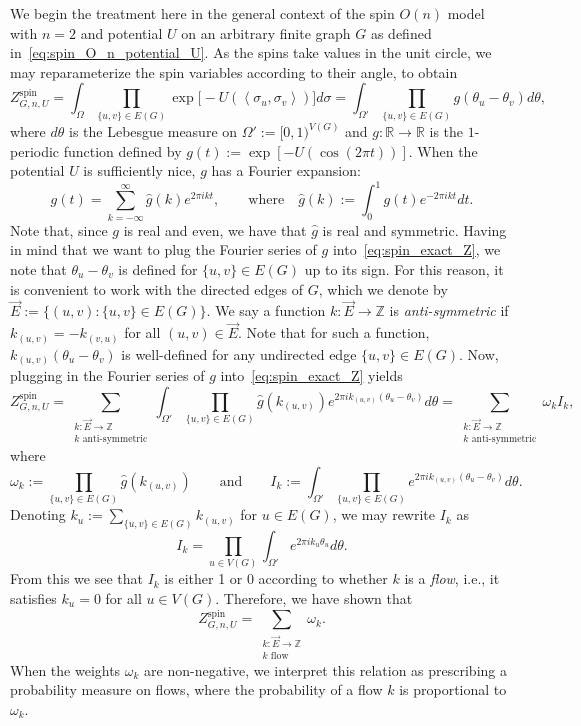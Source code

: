 \documentclass[12pt,reqno]{article}
\def\R{\mathbb{R}}
\def\Z{\mathbb{Z}}
\begin{document}
We begin the treatment here in the general context of the spin $O(n)$ model with $n=2$ and potential $U$ on an arbitrary finite graph $G$ as defined in~\eqref{eq:spin_O_n_potential_U}.
As the spins take values in the unit circle, we may reparameterize the spin variables according to their angle, to obtain
\begin{equation}\label{eq:spin_exact_Z}
Z^{\text{spin}}_{G,n,U} = \int_\Omega \prod_{\{u,v\}\in
    E(G)} \exp \Big[-U(\left\langle\sigma_u,\sigma_v\right\rangle)\Big]
d\sigma = \int_{\Omega'} \prod_{\{u,v\}\in
    E(G)} g(\theta_u - \theta_v)
d\theta ,
\end{equation}
where $d\theta$ is the Lebesgue measure on $\Omega' := [0,1)^{V(G)}$ and $g \colon \R \to \R$ is the $1$-periodic function defined by $g(t) := \exp[-U(\cos(2\pi t))]$.
When the potential $U$ is sufficiently nice, $g$ has a Fourier expansion:
\[ g(t) = \sum_{k=-\infty}^\infty \hat{g}(k) e^{2\pi ikt}, \qquad\text{where}\quad \hat{g}(k) := \int_0^1 g(t) e^{-2\pi ikt} dt .\]
Note that, since $g$ is real and even, we have that $\hat{g}$ is real and symmetric.
Having in mind that we want to plug the Fourier series of $g$ into~\eqref{eq:spin_exact_Z}, we note that $\theta_u - \theta_v$ is defined for $\{u,v\} \in E(G)$ up to its sign. For this reason, it is convenient to work with the directed edges of $G$, which we denote by $\vec{E} := \{ (u,v) : \{u,v\} \in E(G) \}$. We say a function $k \colon \vec{E} \to \Z$ is \emph{anti-symmetric} if $k_{(u,v)}=-k_{(v,u)}$ for all $(u,v) \in \vec{E}$. Note that for such a function, $k_{(u,v)}(\theta_u - \theta_v)$ is well-defined for any undirected edge $\{u,v\} \in E(G)$.
Now, plugging in the Fourier series of $g$ into~\eqref{eq:spin_exact_Z} yields
\[ Z^{\text{spin}}_{G,n,U} = \sum_{\substack{k \colon \vec{E} \to \Z\\k\text{ anti-symmetric}}} \int_{\Omega'} \prod_{\{u,v\}\in E(G)} \hat{g}(k_{(u,v)}) e^{2\pi ik_{(u,v)}(\theta_u - \theta_v)}
d\theta = \sum_{\substack{k \colon \vec{E} \to \Z\\k\text{ anti-symmetric}}} \omega_k I_k ,\]
where
\[ \omega_k := \prod_{\{u,v\}\in E(G)} \hat{g}(k_{(u,v)}) \qquad\text{and}\qquad I_k := \int_{\Omega'} \prod_{\{u,v\}\in E(G)} e^{2\pi ik_{(u,v)}(\theta_u - \theta_v)} d\theta .\]
Denoting $k_u := \sum_{\{u,v\} \in E(G)} k_{(u,v)}$ for $u \in E(G)$, we may rewrite $I_k$ as
\[ I_k = \prod_{u\in V(G)} \int_{\Omega'} e^{2\pi i k_u \theta_u} d\theta .\]
From this we see that $I_k$ is either 1 or 0 according to whether $k$ is a \emph{flow}, i.e., it satisfies $k_u=0$ for all $u \in V(G)$. Therefore, we have shown that
\[ Z^{\text{spin}}_{G,n,U} = \sum_{\substack{k \colon \vec{E} \to \Z\\k\text{ flow}}} \omega_k .\]
When the weights $\omega_k$ are non-negative, we interpret this relation as prescribing a probability measure on flows, where the probability of a flow $k$ is proportional to $\omega_k$.
\end{document}
